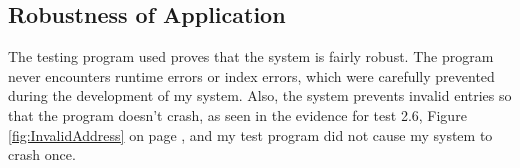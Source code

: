 \subsection{Robustness of Application}

The testing program used proves that the system is fairly robust. The program never encounters runtime errors or index errors, which were carefully prevented during the development of my system. Also, the system prevents invalid entries so that the program doesn't crash, as seen in the evidence for test 2.6, Figure \ref{fig:InvalidAddress} on page \pageref{fig:InvalidAddress},  and my test program did not cause my system to crash once.